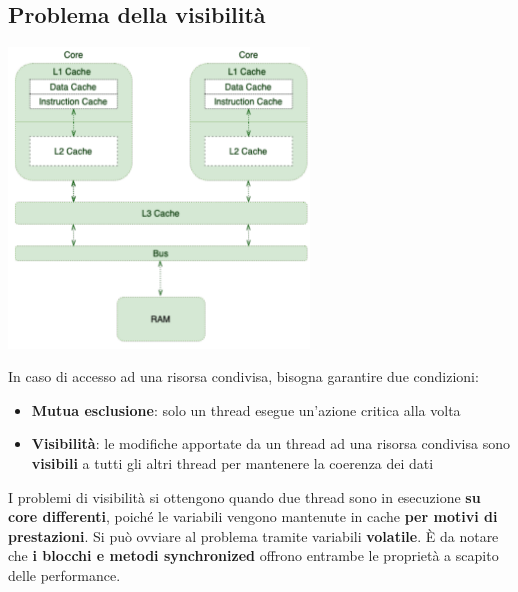 \documentclass[12pt]{article}
\begin{document}
\subsection{Problema della visibilità}
\begin{center}
    \includegraphics[width = 0.60\textwidth]{Images/88.PNG}
\end{center}
In caso di accesso ad una risorsa condivisa, bisogna garantire due condizioni:
\begin{itemize}
    \item \textbf{Mutua esclusione}: solo un thread esegue un'azione critica alla volta
    \item \textbf{Visibilità}: le modifiche apportate da un thread ad una risorsa condivisa sono \textbf{visibili} a tutti gli altri thread per mantenere la coerenza dei dati
\end{itemize}
I problemi di visibilità si ottengono quando due thread sono in esecuzione \textbf{su core differenti}, poiché le variabili vengono mantenute in cache \textbf{per motivi di prestazioni}. Si può ovviare al problema tramite variabili \textbf{volatile}. È da notare che \textbf{i blocchi e metodi synchronized} offrono entrambe le proprietà a scapito delle performance.
\end{document}
